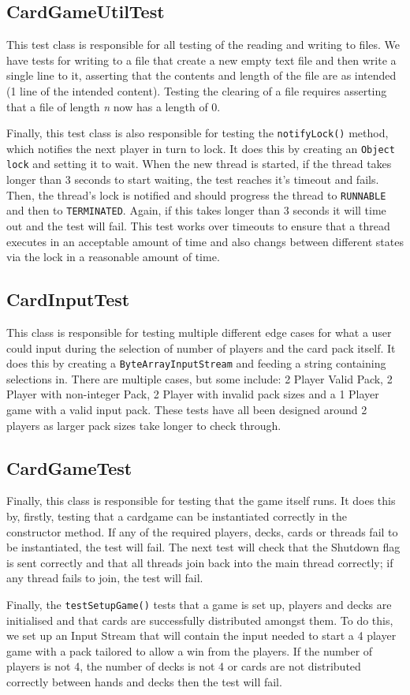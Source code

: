 \documentclass[a4paper, 11pt] {article}
\begin{document}
\subsection*{CardGameUtilTest}
This test class is responsible for all testing of the reading and writing to files. We have tests for writing to a file that create a new empty text file and then write a single line to it, asserting that the contents and length of the file are as intended (1 line of the intended content). Testing the clearing of a file requires asserting that a file of length \textit{n} now has a length of 0.

Finally, this test class is also responsible for testing the \texttt{notifyLock()} method, which notifies the next player in turn to lock. It does this by creating an \texttt{Object lock} and setting it to wait. When the new thread is started, if the thread takes longer than 3 seconds to start waiting, the test reaches it's timeout and fails. Then, the thread's lock is notified and should progress the thread to \texttt{RUNNABLE} and then to \texttt{TERMINATED}. Again, if this takes longer than 3 seconds it will time out and the test will fail. This test works over timeouts to ensure that a thread executes in an acceptable amount of time and also changs between different states via the lock in a reasonable amount of time.

\subsection*{CardInputTest}
This class is responsible for testing multiple different edge cases for what a user could input during the selection of number of players and the card pack itself. It does this by creating a \texttt{ByteArrayInputStream} and feeding a string containing selections in. There are multiple cases, but some include: 2 Player Valid Pack, 2 Player with non-integer Pack, 2 Player with invalid pack sizes and a 1 Player game with a valid input pack. These tests have all been designed around 2 players as larger pack sizes take longer to check through.

\subsection*{CardGameTest}
Finally, this class is responsible for testing that the game itself runs. It does this by, firstly, testing that a cardgame can be instantiated correctly in the constructor method. If any of the required players, decks, cards or threads fail to be instantiated, the test will fail.
The next test will check that the Shutdown flag is sent correctly and that all threads join back into the main thread correctly; if any thread fails to join, the test will fail. 

Finally, the \texttt{testSetupGame()} tests that a game is set up, players and decks are initialised and that cards are successfully distributed amongst them. To do this, we set up an Input Stream that will contain the input needed to start a 4 player game with a pack tailored to allow a win from the players. If the number of players is not 4, the number of decks is not 4 or cards are not distributed correctly between hands and decks then the test will fail.
\end{document}
